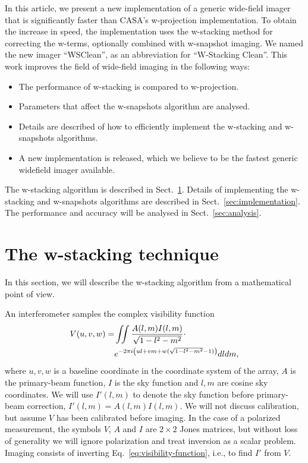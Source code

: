 \documentclass[useAMS,usenatbib]{mn2e}
\begin{document}
In this article, we present a new implementation of a generic wide-field imager that is significantly faster than CASA's w-projection implementation. To obtain the increase in speed, the implementation uses the w-stacking method for correcting the w-terms, optionally combined with w-snapshot imaging. We named the new imager ``WSClean'', as an abbreviation for ``W-Stacking Clean''. This work improves the field of wide-field imaging in the following ways:
\begin{itemize}
 \item The performance of w-stacking is compared to w-projection.
 \item Parameters that affect the w-snapshots algorithm are analysed.
 \item Details are described of how to efficiently implement the w-stacking and w-snapshots algorithms.
 \item A new implementation is released, which we believe to be the fastest generic widefield imager available.
\end{itemize}

The w-stacking algorithm is described in Sect.~\ref{sec:wstacking}. Details of implementing the w-stacking and w-snapshots algorithms are described in Sect.~\ref{sec:implementation}. The performance and accuracy will be analysed in Sect.~\ref{sec:analysis}.

\section{The w-stacking technique} \label{sec:wstacking}
In this section, we will describe the w-stacking algorithm from a mathematical point of view.

An interferometer samples the complex visibility function
\begin{align}\notag
V(u,v,w) = & \iint \frac{A(l,m) I(l,m)}{\sqrt{1-l^2-m^2}} \cdot \\ \label{eq:visibility-function}
& e^{-2\pi i \left(ul + vm + w(\sqrt{1-l^2-m^2}-1)\right)} dl dm,
\end{align}
where $u,v,w$ is a baseline coordinate in the coordinate system of the array, $A$ is the primary-beam function, $I$ is the sky function and $l,m$ are cosine sky coordinates. We will use $I'(l,m)$ to denote the sky function before primary-beam correction, $I'(l,m)=A(l,m)I(l,m)$. We will not discuss calibration, but assume $V$ has been calibrated before imaging. In the case of a polarized measurement, the symbols $V$, $A$ and $I$ are $2\times 2$ Jones matrices, but without loss of generality we will ignore polarization and treat inversion as a scalar problem. Imaging consists of inverting Eq.~\eqref{eq:visibility-function}, i.e., to find $I'$ from $V$.
\end{document}
